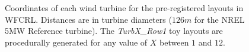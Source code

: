 \documentclass{article}
\begin{document}
\begin{figure}[!htb]
\caption{Coordinates of each wind turbine for the pre-registered layouts in WFCRL. %
Distances are in turbine diameters ($126m$ for the NREL 5MW Reference turbine). The \textit{TurbX\_Row1} toy layouts are procedurally generated for any value of $X$ between $1$ and $12$.}
 \label{fig:layouts}
\end{figure}
\end{document}

